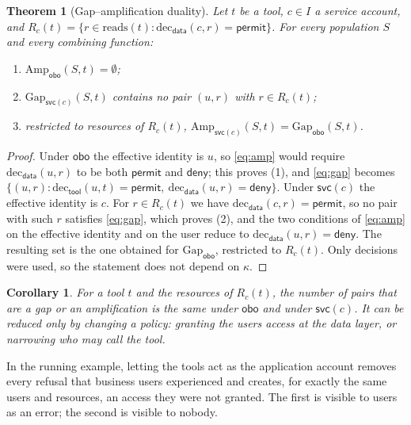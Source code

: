 \documentclass[preprint,12pt]{elsarticle}
\newtheorem{theorem}{Theorem}
\newtheorem{corollary}{Corollary}
\theoremstyle{definition}
\theoremstyle{remark}
\newcommand{\permit}{\mathsf{permit}}
\newcommand{\deny}{\mathsf{deny}}
\newcommand{\dec}{\mathrm{dec}}
\newcommand{\obo}{\mathsf{obo}}
\newcommand{\svc}{\mathsf{svc}}
\newcommand{\reads}{\mathrm{reads}}
\newcommand{\Gap}{\mathrm{Gap}}
\newcommand{\Amp}{\mathrm{Amp}}
\begin{document}
\begin{theorem}[Gap--amplification duality]\label{thm:duality}
Let $t$ be a tool, $c \in I$ a service account, and $R_c(t) = \{r \in \reads(t) : \dec_{\mathsf{data}}(c, r) = \permit\}$. For every population $S$ and every combining function:
\begin{enumerate}
\item $\Amp_{\obo}(S, t) = \emptyset$;
\item $\Gap_{\svc(c)}(S, t)$ contains no pair $(u, r)$ with $r \in R_c(t)$;
\item restricted to resources of $R_c(t)$, $\Amp_{\svc(c)}(S, t) = \Gap_{\obo}(S, t)$.
\end{enumerate}
\end{theorem}
\begin{proof}
Under $\obo$ the effective identity is $u$, so \eqref{eq:amp} would require $\dec_{\mathsf{data}}(u, r)$ to be both $\permit$ and $\deny$; this proves (1), and \eqref{eq:gap} becomes $\{(u, r) : \dec_{\mathsf{tool}}(u, t) = \permit,\ \dec_{\mathsf{data}}(u, r) = \deny\}$. Under $\svc(c)$ the effective identity is $c$. For $r \in R_c(t)$ we have $\dec_{\mathsf{data}}(c, r) = \permit$, so no pair with such $r$ satisfies \eqref{eq:gap}, which proves (2), and the two conditions of \eqref{eq:amp} on the effective identity and on the user reduce to $\dec_{\mathsf{data}}(u, r) = \deny$. The resulting set is the one obtained for $\Gap_{\obo}$, restricted to $R_c(t)$. Only decisions were used, so the statement does not depend on $\kappa$.
\end{proof}

\begin{corollary}\label{cor:invariant}
For a tool $t$ and the resources of $R_c(t)$, the number of pairs that are a gap or an amplification is the same under $\obo$ and under $\svc(c)$. It can be reduced only by changing a policy: granting the users access at the data layer, or narrowing who may call the tool.
\end{corollary}
In the running example, letting the tools act as the application account removes every refusal that business users experienced and creates, for exactly the same users and resources, an access they were not granted. The first is visible to users as an error; the second is visible to nobody.
\end{document}
